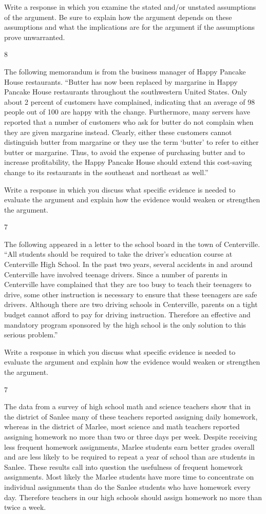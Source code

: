 \documentclass[]{article}
\begin{document}
Write a response in which you examine the stated and/or unstated
assumptions of the argument. Be sure to explain how the argument depends
on these assumptions and what the implications are for the argument if
the assumptions prove unwarranted.

8

The following memorandum is from the business manager of Happy Pancake
House restaurants. ``Butter has now been replaced by margarine in Happy
Pancake House restaurants throughout the southwestern United States.
Only about 2 percent of customers have complained, indicating that an
average of 98 people out of 100 are happy with the change. Furthermore,
many servers have reported that a number of customers who ask for butter
do not complain when they are given margarine instead. Clearly, either
these customers cannot distinguish butter from margarine or they use the
term `butter' to refer to either butter or margarine. Thus, to avoid the
expense of purchasing butter and to increase profitability, the Happy
Pancake House should extend this cost-saving change to its restaurants
in the southeast and northeast as well.''

Write a response in which you discuss what specific evidence is needed
to evaluate the argument and explain how the evidence would weaken or
strengthen the argument.

7

The following appeared in a letter to the school board in the town of
Centerville. ``All students should be required to take the driver's
education course at Centerville High School. In the past two years,
several accidents in and around Centerville have involved teenage
drivers. Since a number of parents in Centerville have complained that
they are too busy to teach their teenagers to drive, some other
instruction is necessary to ensure that these teenagers are safe
drivers. Although there are two driving schools in Centerville, parents
on a tight budget cannot afford to pay for driving instruction.
Therefore an effective and mandatory program sponsored by the high
school is the only solution to this serious problem.''

Write a response in which you discuss what specific evidence is needed
to evaluate the argument and explain how the evidence would weaken or
strengthen the argument.

7

The data from a survey of high school math and science teachers show
that in the district of Sanlee many of these teachers reported assigning
daily homework, whereas in the district of Marlee, most science and math
teachers reported assigning homework no more than two or three days per
week. Despite receiving less frequent homework assignments, Marlee
students earn better grades overall and are less likely to be required
to repeat a year of school than are students in Sanlee. These results
call into question the usefulness of frequent homework assignments. Most
likely the Marlee students have more time to concentrate on individual
assignments than do the Sanlee students who have homework every day.
Therefore teachers in our high schools should assign homework no more
than twice a week.
\end{document}
